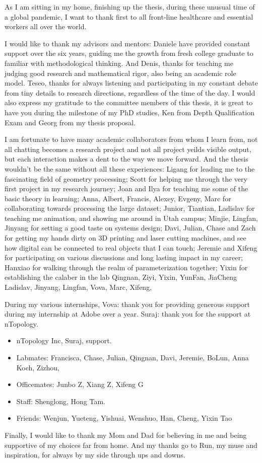 As I am sitting in my home, finishing up the thesis, during these unusual time of a global pandemic, I want to thank first to all front-line healthcare and essential workers all over the world.

I would like to thank my advisors and mentors: Daniele have provided constant support over the six years, guiding me the growth from fresh college graduate to familiar with methodological thinking. And Denis, thanks for teaching me judging good research and mathematical rigor, also being an academic role model. Teseo, thanks for always listening and participating in my constant debate from tiny details to research directions, regardless of the time of the day.
I would also express my gratitude to the committee members of this thesis, it is great to have you during the milestone of my PhD studies, Ken from Depth Qualification Exam and Georg from my thesis proposal.

I am fortunate to have many academic collaborators from whom I learn from, not all chatting becomes a research project and not all project yeilds visible output, but each interaction makes a dent to the way we move forward. And the thesis wouldn't be the same without all these experiences:
Ligang for leading me to the fascinating field of geometry processing;
Scott for helping me through the very first project in my research journey;
Joan and Ilya for teaching me some of the basic theory in learning;
Anna, Albert, Francis, Alexey, Evgeny, Marc for collaborating towards processing the large dataset;
Junior, Tiantian, Ladislav for teaching me animation, and showing me around in Utah campus;
Minjie, Lingfan, Jinyang for setting a good taste on systems design; 
Davi, Julian, Chase and Zach for getting my hands dirty on 3D printing and laser cutting machines, and see how digital can be connected to real objects that I can touch;
Jeremie and Xifeng for participating on various discussions and long lasting impact in my career;
Hanxiao for walking through the realm of parameterization together;
Yixin for establishing the calaber in the lab
Qingnan, Ziyi, Yixin, YunFan, JiaCheng
Ladislav, Jinyang, Lingfan, Vova, Marc, Xifeng, 

During my various internships, Vova: thank you for providing generous support during my internship at Adobe over a year. 
Suraj: thank you for the support at nTopology. 
\begin{itemize}
  \item nTopology Inc, Suraj, support.
  \item Labmates: Francisca, Chase, Julian, Qingnan, Davi, Jeremie, BoLun, Anna Koch, Zizhou,
  \item Officemates: Junbo Z, Xiang Z, Xifeng G
  \item Staff: Shenglong, Hong Tam.
  \item Friends: Wenjun, Yueteng, Yishuai, Wenshuo, Han, Cheng, Yixin Tao
\end{itemize}

Finally, I would like to thank my Mom and Dad for believing in me and being supportive of my choices far from home. And my thanks go to Run, my muse and inspiration, for always by my side through ups and downs.